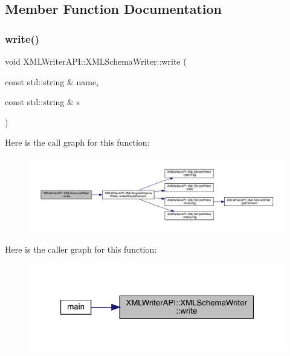 \subsection{Member Function Documentation}
\mbox{\label{classXMLWriterAPI_1_1XMLSchemaWriter_a1922edfcbb9d52c70949fd8c8dd97569}} 
\subsubsection{\texorpdfstring{write()}{write()}\hspace{0.1cm}{\footnotesize\ttfamily [1/15]}}
{\footnotesize\ttfamily void X\+M\+L\+Writer\+A\+P\+I\+::\+X\+M\+L\+Schema\+Writer\+::write (\begin{DoxyParamCaption}\item[{const std\+::string \&}]{name,  }\item[{const std\+::string \&}]{s }\end{DoxyParamCaption})\hspace{0.3cm}{\ttfamily [inline]}}

Here is the call graph for this function\+:
\nopagebreak
\begin{figure}[H]
\begin{center}
\leavevmode
\includegraphics[width=350pt]{db/d34/classXMLWriterAPI_1_1XMLSchemaWriter_a1922edfcbb9d52c70949fd8c8dd97569_cgraph}
\end{center}
\end{figure}
Here is the caller graph for this function\+:
\nopagebreak
\begin{figure}[H]
\begin{center}
\leavevmode
\includegraphics[width=321pt]{db/d34/classXMLWriterAPI_1_1XMLSchemaWriter_a1922edfcbb9d52c70949fd8c8dd97569_icgraph}
\end{center}
\end{figure}
\mbox{\label{classXMLWriterAPI_1_1XMLSchemaWriter_a1922edfcbb9d52c70949fd8c8dd97569}} 
